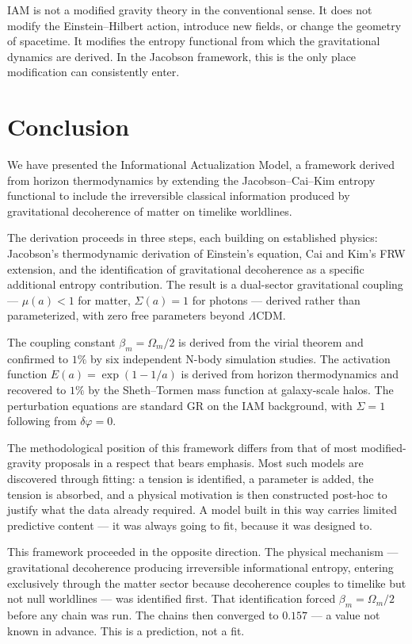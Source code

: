 \documentclass[twocolumn,a4paper,aps,prd,twocolumn,showpacs,notitlepage,superscriptaddress,nofootinbib]{article}
\newcommand{\LCDM}{$\Lambda$CDM}
\newcommand{\betam}{\beta_{m}}
\begin{document}
IAM is not a modified gravity theory in the conventional sense.  It does not
modify the Einstein--Hilbert action, introduce new fields, or change the
geometry of spacetime.  It modifies the entropy functional from which the
gravitational dynamics are derived.  In the Jacobson framework, this is the
only place modification can consistently enter.

\section{Conclusion}
\label{sec:conclusion}

We have presented the Informational Actualization Model, a framework derived
from horizon thermodynamics by extending the Jacobson--Cai--Kim entropy
functional to include the irreversible classical information produced by
gravitational decoherence of matter on timelike worldlines.

The derivation proceeds in three steps, each building on established physics:
Jacobson's thermodynamic derivation of Einstein's equation, Cai and Kim's FRW
extension, and the identification of gravitational decoherence as a specific
additional entropy contribution.  The result is a dual-sector gravitational
coupling — $\mu(a) < 1$ for matter, $\Sigma(a) = 1$ for photons — derived
rather than parameterized, with zero free parameters beyond \LCDM{}.

The coupling constant $\betam = \Omega_m/2$ is derived from the virial theorem
and confirmed to $1\%$ by six independent N-body simulation studies.  The
activation function $E(a) = \exp(1-1/a)$ is derived from horizon thermodynamics
and recovered to $1\%$ by the Sheth--Tormen mass function at galaxy-scale halos.
The perturbation equations are standard GR on the IAM background, with $\Sigma
= 1$ following from $\delta\varphi = 0$.

The methodological position of this framework differs from that of most
modified-gravity proposals in a respect that bears emphasis.
Most such models are discovered through fitting: a tension is identified,
a parameter is added, the tension is absorbed, and a physical motivation
is then constructed post-hoc to justify what the data already required.
A model built in this way carries limited predictive content --- it was
always going to fit, because it was designed to.

This framework proceeded in the opposite direction.
The physical mechanism --- gravitational decoherence producing irreversible
informational entropy, entering exclusively through the matter sector
because decoherence couples to timelike but not null worldlines --- was
identified first.
That identification forced $\betam = \Omega_m/2$ before any chain was run.
The chains then converged to $0.157$ --- a value not known in advance.
This is a prediction, not a fit.
\end{document}
